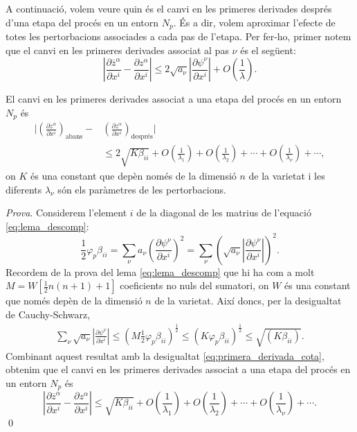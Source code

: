 A continuació, volem veure quin és el canvi en les primeres derivades després d'una etapa del procés en un entorn $N_p$. És a dir, volem aproximar l'efecte de totes les pertorbacions associades a cada pas de l'etapa. Per fer-ho, primer notem que el canvi en les primeres derivades associat al pas $\nu$ és el següent:
\begin{equation}\label{eq:primera_derivada_cota}
    \left| \frac{\partial\overline{z}^\alpha}{\partial x^i} - \frac{\partial z^\alpha}{\partial x^i} \right| \le 2\sqrt{a_\nu}\left| \frac{\partial\psi^\nu}{\partial x^i} \right| + O\left(\frac1\lambda\right).
\end{equation}
\begin{prop}
    El canvi en les primeres derivades associat a una etapa del procés en un entorn $N_p$ és
    \begin{align}\label{eq:moltes_lambdes}
        \nonumber\Bigg| \left(\frac{\partial{z}^\alpha}{\partial x^i} \right)_{\textrm{abans}}- &\left(\frac{\partial{z}^\alpha}{\partial x^i} \right)_{\textrm{després}} \Bigg| \\
        &\le 2\sqrt{K\beta_{ii}} + O\left(\frac1{\lambda_1}\right) + O\left(\frac1{\lambda_2}\right) + \cdots + O\left(\frac1{\lambda_\nu}\right) + \cdots,
    \end{align}
    on $K$ és una constant que depèn només de la dimensió $n$ de la varietat i les diferents $\lambda_\nu$ són els paràmetres de les pertorbacions.
\end{prop}
{
\color{green!50!black}\textit{Prova}.
Considerem l'element $i$ de la diagonal de les matrius de l'equació \ref{eq:lema_descomp}:
\begin{equation*}
    \frac12\varphi_p\beta_{ii} = \sum_\nu a_\nu\left(\frac{\partial\psi^\nu}{\partial x^i}\right)^2 = \sum_\nu \left(\sqrt{a_\nu}\left|\frac{\partial\psi^\nu}{\partial x^i}\right|\right)^2.
\end{equation*}
Recordem de la prova del lema \ref{eq:lema_descomp} que hi ha com a molt $M = W[\frac12n(n+1)+1]$ coeficients no nuls del sumatori, on $W$ és una constant que només depèn de la dimensió $n$ de la varietat. Així doncs, per la desigualtat de Cauchy-Schwarz,
\begin{align*}
    \sum_\nu \sqrt{a_\nu}\left|\frac{\partial\psi^\nu}{\partial x^i}\right| 
    \le 
    \left(M\frac12\varphi_p\beta_{ii}\right)^{\frac12}
    \le
    \left(K\varphi_p\beta_{ii}\right)^{\frac12}
    \le
    \sqrt{\left(K\beta_{ii}\right)}.
\end{align*}
Combinant aquest resultat amb la desigualtat \ref{eq:primera_derivada_cota}, obtenim que el canvi en les primeres derivades associat a una etapa del procés en un entorn $N_p$ és
\begin{equation*}
    \left| \frac{\partial\overline{z}^\alpha}{\partial x^i} - \frac{\partial z^\alpha}{\partial x^i} \right| \le \sqrt{K\beta_{ii}} + O\left(\frac1{\lambda_1}\right) + O\left(\frac1{\lambda_2}\right) + \cdots + O\left(\frac1{\lambda_\nu}\right) + \cdots.
\end{equation*}
\qed
}
